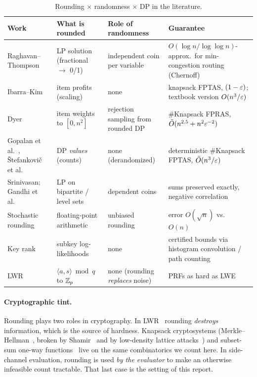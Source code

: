 \begin{table}[h]\centering\small
\begin{tabular}{@{}p{3.3cm}p{3.6cm}p{3.4cm}p{4.4cm}@{}}
\toprule
Work & What is rounded & Role of randomness & Guarantee \\ \midrule
Raghavan--Thompson~\cite{raghavan1987} & LP solution (fractional $\to$ 0/1) & independent coin per variable & $O(\log n/\log\log n)$-approx.\ for min-congestion routing (Chernoff) \\
Ibarra--Kim~\cite{ibarra1975} & item profits (scaling) & none & knapsack FPTAS, $(1-\varepsilon)$; textbook version $O(n^3/\varepsilon)$ \\
Dyer~\cite{dyer2003} & item weights to $[0,n^2]$ & rejection sampling from rounded DP & \#Knapsack FPRAS, $\tilde O(n^{2.5}+n^2\varepsilon^{-2})$ \\
Gopalan et al.~\cite{gopalan2011}, \v{S}tefankovi\v{c} et al.~\cite{stefankovic2012} & DP \emph{values} (counts) & none (derandomized) & deterministic \#Knapsack FPTAS, $\tilde O(n^3/\varepsilon)$ \\
Srinivasan; Gandhi et al.~\cite{srinivasan2001,gandhi2006} & LP on bipartite / level sets & dependent coins & sums preserved exactly, negative correlation \\
Stochastic rounding~\cite{gupta2015,croci2022} & floating-point arithmetic & unbiased rounding & error $O(\sqrt{n})$ vs.\ $O(n)$ \\
Key rank~\cite{veyrat2013,glowacz2015,martin2015} & subkey log-likelihoods & none & certified bounds via histogram convolution / path counting \\
LWR~\cite{bpr2012} & $\langle a,s\rangle \bmod q$ to $\mathbb{Z}_p$ & none (rounding \emph{replaces} noise) & PRFs as hard as LWE \\ \bottomrule
\end{tabular}
\caption{Rounding $\times$ randomness $\times$ DP in the literature.}\label{tab:background}
\end{table}

\paragraph{Cryptographic tint.} Rounding plays two roles in cryptography. In LWR~\cite{bpr2012}
rounding \emph{destroys} information, which is the source of hardness. Knapsack cryptosystems
(Merkle--Hellman~\cite{merkle1978}, broken by Shamir~\cite{shamir1984} and by low-density lattice
attacks~\cite{lagarias1985}) and subset-sum one-way functions~\cite{impagliazzo1996} live on the
same combinatorics we count here. In side-channel evaluation, rounding is used \emph{by the
evaluator} to make an otherwise infeasible count tractable. That last case is the setting of
this report.

